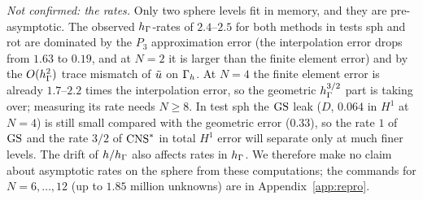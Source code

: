 \emph{Not confirmed: the rates.} Only two sphere levels fit in memory, and they are pre-asymptotic. The observed $h_\Gamma$-rates of $2.4$--$2.5$ for both methods in tests sph and rot are dominated by the $P_3$ approximation error (the interpolation error drops from $1.63$ to $0.19$, and at $N=2$ it is larger than the finite element error) and by the $O(h_\Gamma^2)$ trace mismatch of $\tilde u$ on $\Gamma_h$. At $N=4$ the finite element error is already $1.7$--$2.2$ times the interpolation error, so the geometric $h_\Gamma^{3/2}$ part is taking over; measuring its rate needs $N\ge8$. In test sph the $\mathrm{GS}$ leak ($D$, $0.064$ in $H^1$ at $N=4$) is still small compared with the geometric error ($0.33$), so the rate $1$ of $\mathrm{GS}$ and the rate $3/2$ of $\mathrm{CNS}^\ast$ in total $H^1$ error will separate only at much finer levels. The drift of $h/h_\Gamma$ also affects rates in $h_\Gamma$. We therefore make no claim about asymptotic rates on the sphere from these computations; the commands for $N=6,\dots,12$ (up to $1.85$ million unknowns) are in Appendix~\ref{app:repro}.
